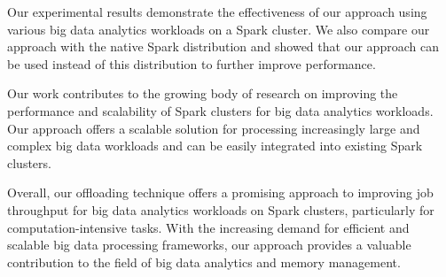 \documentclass[twocolumn,10pt]{asme2e}
\begin{document}
Our experimental results demonstrate the effectiveness of our approach using various big data analytics workloads on a Spark cluster. We also compare our approach with the native Spark distribution and showed that our approach can be used instead of this distribution to further improve performance.

Our work contributes to the growing body of research on improving the performance and scalability of Spark clusters for big data analytics workloads. Our approach offers a scalable solution for processing increasingly large and complex big data workloads and can be easily integrated into existing Spark clusters.

Overall, our offloading technique offers a promising approach to improving job throughput for big data analytics workloads on Spark clusters, particularly for computation-intensive tasks. With the increasing demand for efficient and scalable big data processing frameworks, our approach provides a valuable contribution to the field of big data analytics and memory management.




\begin{acknowledgment}
\end{acknowledgment}

%



\nocite{*}
\end{document}
